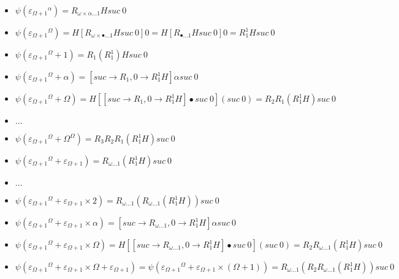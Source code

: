 \documentclass[10pt]{article}
\begin{document}
\begin{itemize}
\item \( \psi({\varepsilon_{\Omega+1}}^\alpha) = R_{\omega \times \alpha \ldots 1} H suc\ 0 \)

\item \( \psi({\varepsilon_{\Omega+1}}^\Omega) = H [R_{\omega \times \bullet \ldots 1} H suc\ 0] 0 = H [R_{\bullet \ldots 1} H suc\ 0] 0 = R^1_1 H suc\ 0 \)

\item \( \psi({\varepsilon_{\Omega+1}}^\Omega+1) = R_1 (R^1_1) H suc\ 0 \)

\item \( \psi({\varepsilon_{\Omega+1}}^\Omega+\alpha) = [suc \rightarrow R_1, 0 \rightarrow R^1_1 H] \alpha suc\ 0 \)

\item \( \psi({\varepsilon_{\Omega+1}}^\Omega+\Omega) = H [[suc \rightarrow R_1, 0 \rightarrow R^1_1 H] \bullet suc\ 0] (suc\ 0) = R_2 R_1 (R^1_1 H) suc\ 0 \)

\item \( \ldots \)

\item \( \psi({\varepsilon_{\Omega+1}}^\Omega+\Omega^\Omega) = R_3 R_2 R_1 (R^1_1 H) suc\ 0 \)

\item \( \psi({\varepsilon_{\Omega+1}}^\Omega+\varepsilon_{\Omega+1}) = R_{\omega \ldots 1} (R^1_1 H) suc\ 0 \)

\item \( \ldots \)

\item \( \psi({\varepsilon_{\Omega+1}}^\Omega+\varepsilon_{\Omega+1} \times 2) = R_{\omega \ldots 1} (R_{\omega \ldots 1} (R^1_1 H)) suc\ 0 \)

\item \( \psi({\varepsilon_{\Omega+1}}^\Omega+\varepsilon_{\Omega+1} \times \alpha) = [suc \rightarrow R_{\omega \ldots 1}, 0 \rightarrow R^1_1 H] \alpha suc\ 0 \)

\item \( \psi({\varepsilon_{\Omega+1}}^\Omega+\varepsilon_{\Omega+1} \times \Omega) = H [[suc \rightarrow R_{\omega \ldots 1}, 0 \rightarrow R^1_1 H] \bullet suc\ 0] (suc\ 0) = R_2 R_{\omega \ldots 1} (R^1_1 H) suc\ 0 \)

\item \( \psi({\varepsilon_{\Omega+1}}^\Omega+\varepsilon_{\Omega+1} \times \Omega+\varepsilon_{\Omega+1}) = \psi({\varepsilon_{\Omega+1}}^\Omega+\varepsilon_{\Omega+1} \times (\Omega+1)) = R_{\omega \ldots 1} (R_2 R_{\omega \ldots 1} (R^1_1 H)) suc\ 0 \)


\end{itemize}
\end{document}
